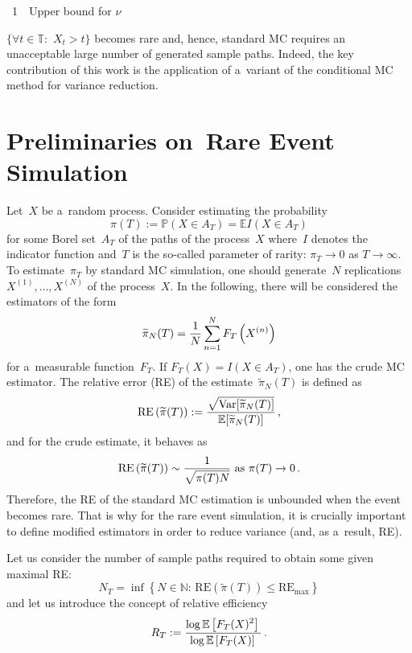 \begin{multicols}{2}
{\begin{center}
\noindent
{{\figurename~1}\ \ \small{Upper bound for $\nu$}}

\end{center}
}


\addtocounter{figure}{1}


\noindent
$\{\forall t \in \mathbb{T}:\,\,X_t >t\}$  becomes rare and,  
hence, standard MC requires an unacceptable large number of generated sample paths. 
Indeed, the key contribution of this work is the application of a~variant of the 
conditional MC method for variance reduction.


\section{Preliminaries on~Rare Event Simulation}

\noindent
Let~$X$ be a~random process. Consider estimating the probability
$$
\pi(T):=\mathbb{P}\left(X \in A_T\right) = \mathbb{E} I\left(X \in A_T\right)
$$
for some Borel set~$A_T$ of the paths of the process~$X$ 
where~$I$ denotes the indicator function and~$T$ is the so-called parameter of 
rarity: $\pi_T \to 0$ as $T \to \infty$. To estimate~$\pi_T$ by standard 
MC simulation, one should generate~$N$ replications $X^{(1)},\ldots,X^{(N)}$ of 
the process~$X$. In the following, there will be considered the estimators of the form
\begin{equation}
\widetilde{\pi}_N(T)=\displaystyle\frac{\displaystyle 1\mathstrut}{\displaystyle N\mathstrut} \sum\limits_{n=1}^N F_T \left(X^{(n)}\right) \label{est-l1}
\end{equation}
for a~measurable function~$F_T$. If $F_T(X)=I(X \in A_T)$, one has the crude MC 
estimator.
The relative error (RE) of the estimate~$\widetilde{\pi}_N(T)$ is defined as
$$
 \mathrm{RE} \left(\widetilde{\pi}(T)\right):=
 \displaystyle\frac{\displaystyle \sqrt{\mathrm{Var} [\widetilde{\pi}_N(T)]}\mathstrut}{\displaystyle \mathbb{E} [\widetilde{\pi}_N(T)]\mathstrut}\,,
$$
and for the crude estimate, it behaves as
$$
\mathrm{RE} \left(\widetilde{\pi}(T)\right) \sim \displaystyle\frac{\displaystyle 1\mathstrut}{\displaystyle \sqrt{\pi(T) N}\mathstrut}\
\mbox{as}\ \pi(T) \to 0\,.
$$
Therefore, the RE of the standard MC estimation is unbounded when the event becomes 
rare. That is why for the rare event simulation, it is crucially important to define 
modified estimators in order to reduce variance (and, as a~result, RE).

Let us consider the number of sample paths required to obtain some given maximal RE:
\begin{equation*}
N_T = \inf \left\{N \in \mathbb{N}:\, \mathrm{RE}\left(\widetilde{\pi}(T)\right) 
\le \mathrm{RE_{\max}}\right\}
\end{equation*}
and let us introduce the concept of relative efficiency
\begin{equation*}
R_T:= \displaystyle\frac{\displaystyle  \log \mathbb{E} \left[F_T(X)^2\right]\mathstrut}{\displaystyle \log \mathbb{E} \left[F_T(X)\right]\mathstrut}\,.
\end{equation*}


\end{multicols}
